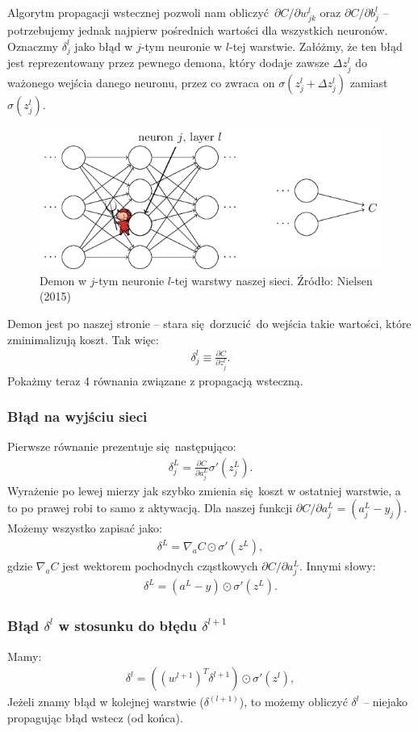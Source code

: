 \documentclass[10pt, oneside]{article}
\theoremstyle{remark}
\begin{document}
Algorytm propagacji wstecznej pozwoli nam obliczyć $\partial C / \partial w^l_{jk}$ oraz $\partial C / \partial b^l_{j}$ -- potrzebujemy jednak najpierw pośrednich wartości dla wszystkich neuronów.
Oznaczmy $\delta_j^l$ jako błąd w $j$-tym neuronie w $l$-tej warstwie.
Załóżmy, że ten błąd jest reprezentowany przez pewnego demona, który dodaje zawsze $\Delta z^l_j$ do ważonego wejścia danego neuronu, przez co zwraca on $\sigma(z^l_j+\Delta z^l_j)$ zamiast $\sigma(z^l_j)$.
\begin{figure}[!htpb]
	\centering
	\includegraphics[width=.5\linewidth]{figures/tikz19}
	\caption{Demon w $j$-tym neuronie $l$-tej warstwy naszej sieci. Źródło: Nielsen (2015)}
\end{figure}
Demon jest po naszej stronie -- stara się dorzucić do wejścia takie wartości, które zminimalizują koszt. 
Tak więc:
\begin{eqnarray} 
  \delta^l_j \equiv \frac{\partial C}{\partial z^l_j}.
\end{eqnarray}
Pokażmy teraz 4 równania związane z propagacją wsteczną.

\subsubsection{Błąd na wyjściu sieci}
Pierwsze równanie prezentuje się następująco:
\begin{eqnarray} 
  \delta^L_j = \frac{\partial C}{\partial a^L_j} \sigma'(z^L_j).
\end{eqnarray}
Wyrażenie po lewej mierzy jak szybko zmienia się koszt w ostatniej warstwie, a to po prawej robi to samo z aktywacją.
Dla naszej funkcji $\partial C / \partial a^L_j = (a_j^L-y_j)$.
Możemy wszystko zapisać jako:
\begin{eqnarray} 
  \delta^L = \nabla_a C \odot \sigma'(z^L),
\end{eqnarray}
gdzie $\nabla_a C$ jest wektorem pochodnych cząstkowych ${\partial C}/{\partial a^L_j}$.
Innymi słowy:
\begin{eqnarray} 
  \delta^L = (a^L-y) \odot \sigma'(z^L).
\end{eqnarray}
\subsubsection{Błąd $\delta^l$ w stosunku do błędu $\delta^{l+1}$}
Mamy:
\begin{eqnarray} 
  \delta^l = ((w^{l+1})^T \delta^{l+1}) \odot \sigma'(z^l),
\end{eqnarray}
Jeżeli znamy błąd w kolejnej warstwie ($\delta^(l+1)$), to możemy obliczyć $\delta^l$ -- niejako propagując błąd wstecz (od końca).
\end{document}
